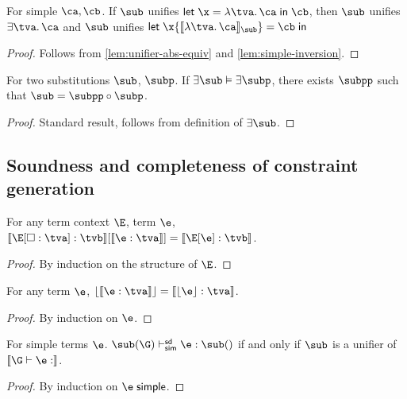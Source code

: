 \documentclass[acmsmall,screen,nonacm,review]{acmart}
\begin{document}
\begin{lemma}
  For simple $\ca, \cb$.
  If $\sub$ unifies $\clet \x \tv \ca \cb$, then
  $\sub$ unifies $\cexists \tv \ca$ and
  $\sub$ unifies $\cletin \x {\csem {\cabs \tv \ca}_\sub} \cb$
  \begin{proof}
    Follows from \cref{lem:unifier-abs-equiv} and \cref{lem:simple-inversion}.
  \end{proof}
\end{lemma}

\begin{lemma}
  \label{lem:mgus}
  For two substitutions $\sub$, $\subp$. If $\exists \sub \centails \exists \subp$, there exists
  $\subpp$ such that $\sub = \subpp \compose \subp$.
  \begin{proof}
    Standard result, follows from definition of $\exists \sub$.
  \end{proof}
\end{lemma}

\subsection{Soundness and completeness of constraint generation}

\begin{lemma}
  \label{lem:ctxt-gen-correctness}
  For any term context $\E$, term $\e$, $\ctxinfer \E \tv \tvb \where{\cinfer \e \tv} = \cinfer {\E\where{\e}} \tvb$.
  \begin{proof}
    By induction on the structure of $\E$.
  \end{proof}
\end{lemma}

\begin{lemma}
  \label{lem:erasure-constraint-gen}
  For any term $\e$, $\cerase {\cinfer \e \tv} = \cinfer {\eerase \e} \tv$.
  \begin{proof}
    By induction on $\e$.
  \end{proof}
\end{lemma}

\begin{lemma}
  \label{lem:simple-soundness-completeness}
  For simple terms $\e$.
  $\sub(\G) \thsimplesd \e : \sub(\t)$ if and only if $\sub$ is a unifier of $\csem {\G \th \e : \t}$.
  \begin{proof}
    By induction on $\e \simple$.
  \end{proof}
\end{lemma}
\end{document}
